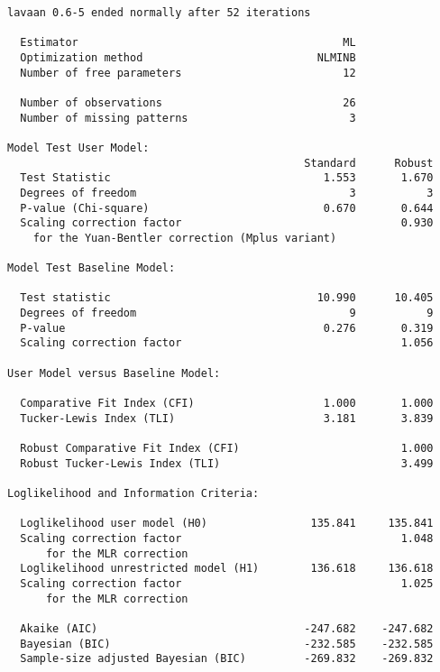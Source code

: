 \begin{verbatim}
lavaan 0.6-5 ended normally after 52 iterations

  Estimator                                         ML
  Optimization method                           NLMINB
  Number of free parameters                         12
                                                      
  Number of observations                            26
  Number of missing patterns                         3
                                                      
Model Test User Model:
                                              Standard      Robust
  Test Statistic                                 1.553       1.670
  Degrees of freedom                                 3           3
  P-value (Chi-square)                           0.670       0.644
  Scaling correction factor                                  0.930
    for the Yuan-Bentler correction (Mplus variant) 

Model Test Baseline Model:

  Test statistic                                10.990      10.405
  Degrees of freedom                                 9           9
  P-value                                        0.276       0.319
  Scaling correction factor                                  1.056

User Model versus Baseline Model:

  Comparative Fit Index (CFI)                    1.000       1.000
  Tucker-Lewis Index (TLI)                       3.181       3.839
                                                                  
  Robust Comparative Fit Index (CFI)                         1.000
  Robust Tucker-Lewis Index (TLI)                            3.499

Loglikelihood and Information Criteria:

  Loglikelihood user model (H0)                135.841     135.841
  Scaling correction factor                                  1.048
      for the MLR correction                                      
  Loglikelihood unrestricted model (H1)        136.618     136.618
  Scaling correction factor                                  1.025
      for the MLR correction                                      
                                                                  
  Akaike (AIC)                                -247.682    -247.682
  Bayesian (BIC)                              -232.585    -232.585
  Sample-size adjusted Bayesian (BIC)         -269.832    -269.832


\end{verbatim}
